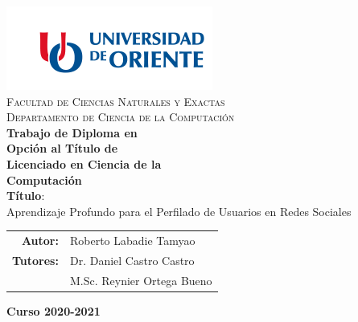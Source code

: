 \documentclass[11pt, letterpaper]{report}
\begin{document}
	\begin{titlepage}
	\begin{minipage}[t]{0.48\textwidth}
		\BgThispage
		\parbox{\textwidth}{}
	\end{minipage}
	\begin{minipage}[t]{0.55\textwidth}
			\parbox{\textwidth}{
				\includegraphics[width=.8\textwidth]{images/logo.png}\\[0.5cm]
				\centering\textsc{Facultad de Ciencias Naturales y Exactas}\\[0.2cm]
				\centering\textsc{Departamento de Ciencia de la Computación}\\[2.2cm]
				\textbf{\LARGE Trabajo de Diploma en\\[-.1cm]Opción al Título de\\[-.1cm]Licenciado en Ciencia de la\\[-.1cm]Computación\\[2.2cm]}
				\Large  \textbf{Título}:\\
				\fontsize{18pt}{20pt}\selectfont Aprendizaje Profundo para el Perfilado de Usuarios en Redes Sociales\\
				\vspace{10mm}
				\begin{tabular}{rp{}}
					{\Large \bf Autor:} & {\Large Roberto Labadie Tamyao} \\[.5cm]
					{\Large \bf Tutores:} & {\Large Dr. Daniel Castro Castro} \\[.5cm]
					& {\Large M.Sc. Reynier Ortega Bueno} \\[.5cm]
				\end{tabular}
				
				\vspace{10mm}
				{\Large \textbf{Curso 2020-2021}}
			}
	\end{minipage}
	\end{titlepage}
	
	\thispagestyle{empty} 	
	\chapterfont{\flushright}
	\renewcommand{\contentsname}{Contenido} \tableofcontents
	\renewcommand{\listfigurename}{Lista de Figuras}
	\renewcommand{\tablename}{Tabla}

	\listoffigures
	
	
	
	
	\renewcommand{\bibname}{Referencias Bibliográficas}
	
	
\end{document}
